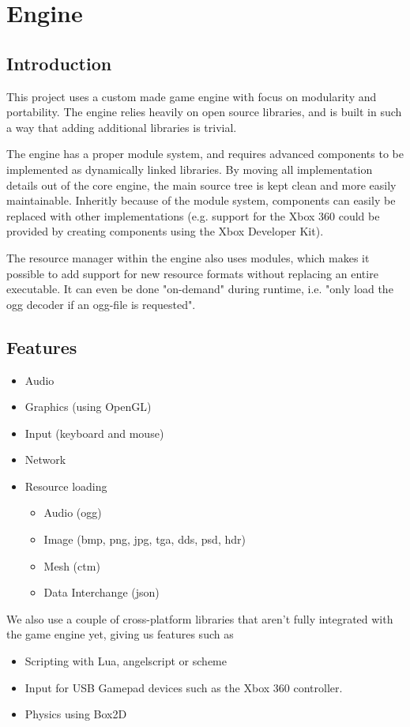 
\chapter{Engine}
\section{Introduction}
This project uses a custom made game engine with focus on modularity and portability. The engine relies heavily on open source libraries, and is built in such a way that adding additional libraries is trivial.

The engine has a proper module system, and requires advanced components to be implemented as dynamically linked libraries. By moving all implementation details out of the core engine, the main source tree is kept clean and more easily maintainable. Inheritly because of the module system, components can easily be replaced with other implementations (e.g. support for the Xbox 360 could be provided
by creating components using the Xbox Developer Kit).

The resource manager within the engine also uses modules, which makes it possible to add support for new resource formats without replacing an entire executable. It can even
be done "on-demand" during runtime, i.e. "only load the ogg decoder if an ogg-file is requested".

 \section{Features}
 \begin{itemize}
 \item Audio
 \item Graphics (using OpenGL)
 \item Input (keyboard and mouse)
 \item Network
 \item Resource loading
 	\begin{itemize}
 		\item Audio (ogg)
 		\item Image (bmp, png, jpg, tga, dds, psd, hdr)
 		\item Mesh (ctm)
 		\item Data Interchange (json)
 	\end{itemize}
 \end{itemize}

We also use a couple of cross-platform libraries that aren't fully integrated with the game engine yet, giving us features such as
\begin{itemize}
\item Scripting with Lua, angelscript or scheme
\item Input for USB Gamepad devices such as the Xbox 360 controller.
\item Physics using Box2D
\end{itemize}

